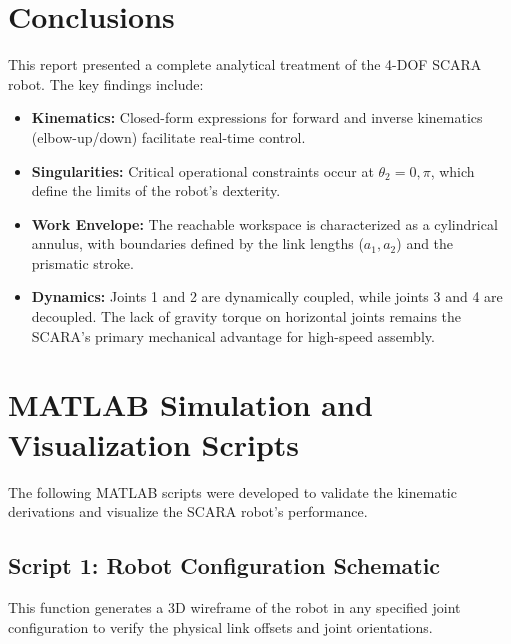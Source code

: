 \documentclass{article}
\begin{document}
\section{Conclusions}
This report presented a complete analytical treatment of the 4-DOF SCARA robot. The key findings include:
\begin{itemize}
    \item \textbf{Kinematics:} Closed-form expressions for forward and inverse kinematics (elbow-up/down) facilitate real-time control.
    \item \textbf{Singularities:} Critical operational constraints occur at $\theta_2 = 0, \pi$, which define the limits of the robot's dexterity.
    \item \textbf{Work Envelope:} The reachable workspace is characterized as a cylindrical annulus, with boundaries defined by the link lengths ($a_1, a_2$) and the prismatic stroke.
    \item \textbf{Dynamics:} Joints 1 and 2 are dynamically coupled, while joints 3 and 4 are decoupled. The lack of gravity torque on horizontal joints remains the SCARA's primary mechanical advantage for high-speed assembly.
\end{itemize}


\newpage
\appendix
\section{MATLAB Simulation and Visualization Scripts}
The following MATLAB scripts were developed to validate the kinematic derivations and visualize the SCARA robot's performance.

\subsection{Script 1: Robot Configuration Schematic}
This function generates a 3D wireframe of the robot in any specified joint configuration to verify the physical link offsets and joint orientations.
\end{document}
